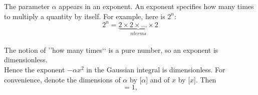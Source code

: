 \documentclass[a4paper]{article}
\begin{document}
The parameter $\alpha$ appears in an exponent. An exponent specifies how
many times to multiply a quantity by itself. For example, here is $2^{n}$:
\\

\begin{equation}
2^{n}=\underbrace{2 \times 2 \times... \times 2}_{n  terms}
\end{equation}
\\

The notion of ’’how many times‘‘ is a pure number, so an exponent is
dimensionless.
\\

Hence the exponent −$\alpha x^{2}$ in the Gaussian integral is dimensionless. For
convenience, denote the dimensions of $\alpha$ by [$\alpha$] and of $x$ by [$x$]. Then
\\
\begin{equation}
[\alpha][x^{2}]=1,
\end{equation}
\end{document}
